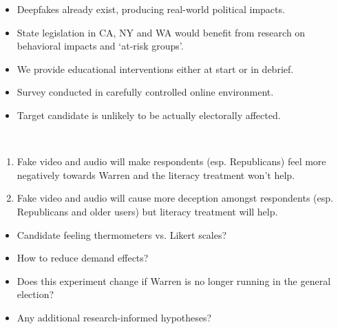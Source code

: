 \documentclass[a0,landscape]{a0poster}
\begin{document}
\begin{multicols}{3}
\Large{
\begin{itemize}
    \item Deepfakes already exist, producing real-world political impacts.
    \item State legislation in CA, NY and WA would benefit from research on behavioral impacts and `at-risk groups'.
    \item We provide educational interventions either at start or in debrief.
    \item Survey conducted in carefully controlled online environment.
    \item Target candidate is unlikely to be actually electorally affected.
\end{itemize}
}

\ \newline
\begin{tcolorbox}[colback=black!0,colframe=green!40!black,
title=\Huge{\textbf{Pre-Registered Hypotheses}},
boxrule=2pt,arc=0.5em,boxsep=4mm]
\Large{
\begin{enumerate}
    \item Fake video and audio will make respondents (esp. Republicans) feel more negatively towards Warren and the literacy treatment won't help. 
    \item Fake video and audio will cause more deception amongst respondents (esp. Republicans and older users) but literacy treatment will help.
\end{enumerate}
}
\end{tcolorbox}

\vspace{1em}

\begin{tcolorbox}[colback=black!0,colframe=blue!40!black,
title=\Huge{\textbf{Help Us!}},
boxrule=2pt,arc=0.5em,boxsep=4mm]

{\Large 
\begin{itemize}
    \item Candidate feeling thermometers vs. Likert scales?
    \item How to reduce demand effects? 
    \item Does this experiment change if Warren is no longer running in the general election?
    \item Any additional research-informed hypotheses?
\end{itemize}
}
\end{tcolorbox}

\end{multicols}
\end{document}
